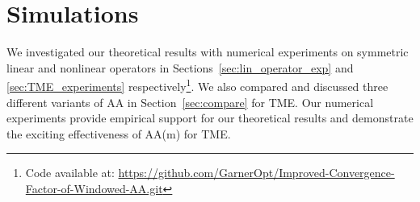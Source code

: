 \documentclass[11pt]{article}
\begin{document}
%
%
\section{Simulations}\label{sec:simulations}
We investigated our theoretical results with numerical experiments on symmetric linear and nonlinear operators in Sections~\ref{sec:lin_operator_exp} and \ref{sec:TME_experiments} respectively\footnote{Code available at: \href{https://github.com/GarnerOpt/Improved-Convergence-Factor-of-Windowed-AA.git}{https://github.com/GarnerOpt/Improved-Convergence-Factor-of-Windowed-AA.git}}.
We also compared and discussed three different variants of AA in Section~\ref{sec:compare} for TME. 
Our numerical experiments provide empirical support for our theoretical results and demonstrate the exciting effectiveness of AA(m) for TME. 

\end{document}
